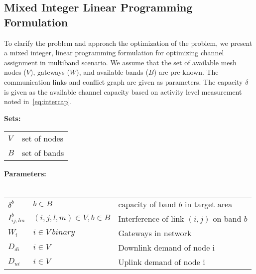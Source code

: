 \subsection{Mixed Integer Linear Programming Formulation}
\label{subsec:linearopt}

To clarify the problem and approach the optimization of the 
problem, we present a mixed integer, linear programming 
formulation for optimizing channel assignment in multiband
scenario. We assume that the set of available mesh nodes 
($V$), gateways ($W$), and available bands ($B$) are pre-known. 
The communication links and conflict graph are given as parameters.
The capacity $\delta$ is given as the available channel capacity
based on activity level measurement noted in~\ref{eq:intercap}. 

\noindent
{\bf Sets:}
\begin{tabular}{ll}
$V$ & set of nodes \\
$B$ & set of bands \\
\end{tabular}

\noindent
{\bf Parameters:}\\
\\
\begin{tabular}{llp{3.4cm}}
$\delta^b$ & $b \in B$ & capacity of band $b$ in target area\\
$I_{ij,lm}^b$ & $(i,j,l,m) \in V, b\in B $ & Interference of link $(i,j)$ on band $b$\\
$W_i$ & $i \in V\ binary$ & Gateways in network\\
$D_{di}$ & $i \in V\ $ & Downlink demand of node i\\
$D_{ui}$ & $i \in V\ $ & Uplink demand of node i\\
\end{tabular}


